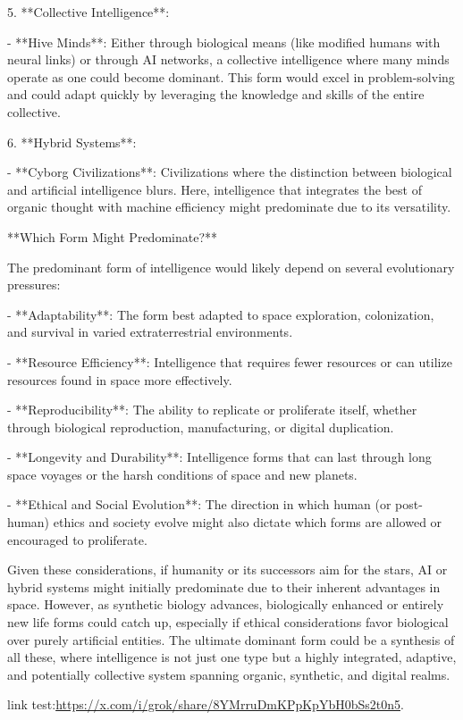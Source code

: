 \documentclass[12pt,titlepage]{book}
\begin{document}
5. **Collective Intelligence**:

   - **Hive Minds**: Either through biological means (like modified humans with neural links) or through AI networks, a collective intelligence where many minds operate as one could become dominant. This form would excel in problem-solving and could adapt quickly by leveraging the knowledge and skills of the entire collective.

6. **Hybrid Systems**:

   - **Cyborg Civilizations**: Civilizations where the distinction between biological and artificial intelligence blurs. Here, intelligence that integrates the best of organic thought with machine efficiency might predominate due to its versatility.

**Which Form Might Predominate?**

The predominant form of intelligence would likely depend on several evolutionary pressures:

- **Adaptability**: The form best adapted to space exploration, colonization, and survival in varied extraterrestrial environments.

- **Resource Efficiency**: Intelligence that requires fewer resources or can utilize resources found in space more effectively.

- **Reproducibility**: The ability to replicate or proliferate itself, whether through biological reproduction, manufacturing, or digital duplication.

- **Longevity and Durability**: Intelligence forms that can last through long space voyages or the harsh conditions of space and new planets.

- **Ethical and Social Evolution**: The direction in which human (or post-human) ethics and society evolve might also dictate which forms are allowed or encouraged to proliferate. 

Given these considerations, if humanity or its successors aim for the stars, AI or hybrid systems might initially predominate due to their inherent advantages in space. However, as synthetic biology advances, biologically enhanced or entirely new life forms could catch up, especially if ethical considerations favor biological over purely artificial entities. The ultimate dominant form could be a synthesis of all these, where intelligence is not just one type but a highly integrated, adaptive, and potentially collective system spanning organic, synthetic, and digital realms.

link test:\url{https://x.com/i/grok/share/8YMrruDmKPpKpYbH0bSs2t0n5}.
\end{document}
